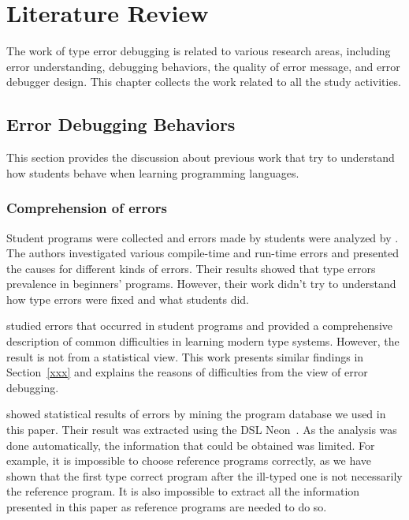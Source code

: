 \documentclass[12pt]{report}	%
\begin{document}
\chapter{Literature Review}
\label{sec:review}

The work of type error debugging is related to various research areas, including
error understanding, debugging behaviors, the quality of error message,
and error debugger design.
This chapter collects the work related to all the study activities.

\section{Error Debugging Behaviors}
\label{sec:review:behavior}

This section provides the discussion about previous work that try to understand how students behave when learning programming languages.

\subsection{Comprehension of errors}

Student programs were collected and errors made by students
were analyzed by \cite{tirronen2015understanding}.
The authors investigated various compile-time and run-time errors
and presented the causes for different kinds of errors.
Their results showed that type errors prevalence in beginners' programs.
However, their work didn't try to understand how type
errors were fixed and what students did.

\cite{tirronen2014study} studied
errors that occurred in student programs and
provided a comprehensive description of
common difficulties in learning modern type systems.
However, the result is not from a statistical view.
This work presents similar findings in Section~\ref{xxx}
and explains the
reasons of difficulties from the view of error debugging.

\cite{hage2006mining} showed statistical
results of errors by mining the program database we used
in this paper.
Their result was extracted using the DSL Neon~\cite{Hage09:Neon}.
As the analysis was done automatically, the information that
could be obtained was limited. For example, it is impossible
to choose reference programs correctly, as we have shown that
the first type correct program after the ill-typed one is not
necessarily the reference program. It is also impossible to
extract all the information presented in this paper as
reference programs are needed to do so.
\end{document}

